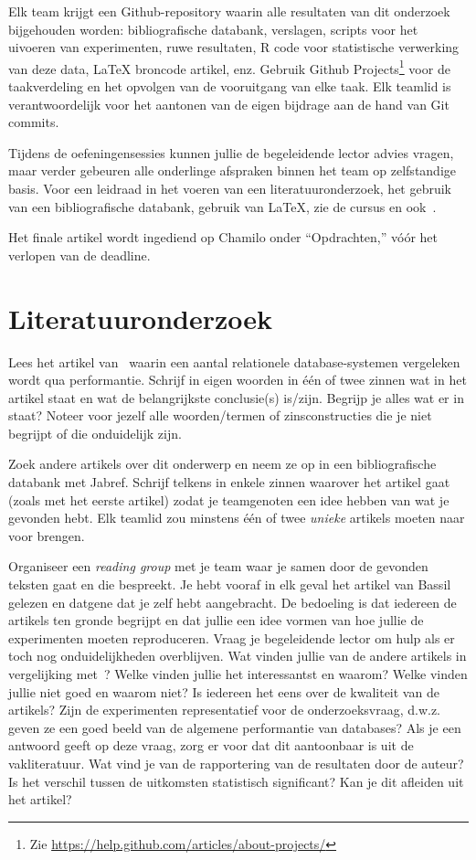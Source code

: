 \documentclass[fleqn,10pt]{voorstel}
\begin{document}
Elk team krijgt een Github-repository waarin alle resultaten van dit onderzoek bijgehouden worden: bibliografische databank, verslagen, scripts voor het uivoeren van experimenten, ruwe resultaten, R code voor statistische verwerking van deze data, {\LaTeX} broncode artikel, enz. Gebruik Github Projects\footnote{Zie \url{https://help.github.com/articles/about-projects/}} voor de taakverdeling en het opvolgen van de vooruitgang van elke taak. Elk teamlid is verantwoordelijk voor het aantonen van de eigen bijdrage aan de hand van Git commits. 

Tijdens de oefeningensessies kunnen jullie de begeleidende lector advies vragen, maar verder gebeuren alle onderlinge afspraken binnen het team op zelfstandige basis. Voor een leidraad in het voeren van een literatuuronderzoek, het gebruik van een bibliografische databank, gebruik van \LaTeX{}, zie de cursus en ook~\autocite{VanVreckem2017}.

Het finale artikel wordt ingediend op Chamilo onder ``Opdrachten,'' vóór het verlopen van de deadline.


\section{Literatuuronderzoek}

Lees het artikel van~\textcite{Bassil2012} waarin een aantal relationele database-systemen vergeleken wordt qua performantie. Schrijf in eigen woorden in één of twee zinnen wat in het artikel staat en wat de belangrijkste conclusie(s) is/zijn. Begrijp je alles wat er in staat? Noteer voor jezelf alle woorden/termen of zinsconstructies die je niet begrijpt of die onduidelijk zijn.

Zoek andere artikels over dit onderwerp en neem ze op in een bibliografische databank met Jabref. Schrijf telkens in enkele zinnen waarover het artikel gaat (zoals met het eerste artikel) zodat je teamgenoten een idee hebben van wat je gevonden hebt. Elk teamlid zou minstens één of twee \emph{unieke} artikels moeten naar voor brengen.

Organiseer een \emph{reading group} met je team waar je samen door de gevonden teksten gaat en die bespreekt. Je hebt vooraf in elk geval het artikel van Bassil gelezen en datgene dat je zelf hebt aangebracht. De bedoeling is dat iedereen de artikels ten gronde begrijpt en dat jullie een idee vormen van hoe jullie de experimenten moeten reproduceren. Vraag je begeleidende lector om hulp als er toch nog onduidelijkheden overblijven. Wat vinden jullie van de andere artikels in vergelijking met~\textcite{Bassil2012}? Welke vinden jullie het interessantst en waarom? Welke vinden jullie niet goed en waarom niet? Is iedereen het eens over de kwaliteit van de artikels? Zijn de experimenten representatief voor de onderzoeksvraag, d.w.z. geven ze een goed beeld van de algemene performantie van databases? Als je een antwoord geeft op deze vraag, zorg er voor dat dit aantoonbaar is uit de vakliteratuur. Wat vind je van de rapportering van de resultaten door de auteur? Is het verschil tussen de uitkomsten statistisch significant? Kan je dit afleiden uit het artikel?
\end{document}
